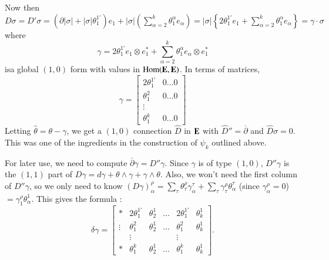 Now then $D\sigma=D'\sigma=(\partial |\sigma|+|\sigma|\theta^{1'}_{1})e_{1}+|\sigma|\left(\sum\limits^{k}_{\alpha=2}\theta^{\alpha}_{1}e_{\alpha}\right)=|\sigma|\left\{2\theta^{1'}_{1}e_{1}+\sum\limits^{k}_{\alpha=2}\theta^{\alpha}_{1}e_{\alpha}\right\}=\gamma\cdot \sigma$ where
\begin{equation*}
\gamma=2\theta^{1'}_{1}e_{1}\otimes e^{*}_{1}+\sum\limits^{k}_{\alpha=2}\theta^{\alpha}_{1}e_{\alpha}\otimes e^{*}_{1}\tag{8.15}\label{art08-sec8-eq8.15}
\end{equation*}
is\pageoriginale a global $(1,0)$ form with values in $\operatorname{\mathrm{Hom}}(\mathbf{E},\mathbf{E})$. In terms of matrices,
\begin{equation*}
\gamma=
\begin{bmatrix}
2\theta^{1'}_{1} & 0\ldots 0\\
\theta^{2}_{1} & 0\ldots 0\\
\vdots & \\
\theta^{k}_{1} & 0\ldots 0
\end{bmatrix}\tag{8.16}\label{art08-sec8-eq8.16}
\end{equation*}
Letting $\widehat{\theta}=\theta-\gamma$, we get a $(1,0)$ connection $\widehat{D}$ in $\mathbf{E}$ with $\widehat{D}''=\overline{\partial}$ and $\widehat{D}\sigma=0$. This was one of the ingredients in the construction of $\psi_{k}$ outlined above.

For later use, we need to compute $\overline{\partial}\gamma=D''\gamma$. Since $\gamma$ is of type $(1,0)$, $D''\gamma$ is the $(1,1)$ part of $D\gamma=d\gamma+\theta\wedge\gamma+\gamma\wedge \theta$. Also, we won't need the first column of $D''\gamma$, so we only need to know $(D\gamma)^{\rho}_{\alpha}=\sum\limits_{\tau}\theta^{\rho}_{\tau}\gamma^{\tau}_{\alpha}+\sum\limits_{\tau}\gamma^{\rho}_{\tau}\theta^{\tau}_{\alpha}$ (since $\gamma^{\rho}_{\alpha}=0$) $=\gamma^{\rho}_{1}\theta^{1}_{\alpha}$. This gives the formula :
\begin{equation*}
\delta\gamma =
\begin{bmatrix}
* & 2\theta^{1'}_{1} & \theta^{1}_{2} & \ldots & 2\theta^{1'}_{1} & \theta^{1}_{k}\\
\vdots & \theta^{2}_{1} & \theta^{1}_{2} & \ldots & \theta^{2}_{1} & \theta^{1}_{k}\\
 & \vdots & & & \vdots & \\
* & \theta^{k}_{1} & \theta^{1}_{2} & \ldots & \theta^{k}_{1} & \theta^{1}_{k}
\end{bmatrix}.\tag{8.17}
\label{art08-sec8-eq8.17}
\end{equation*}

